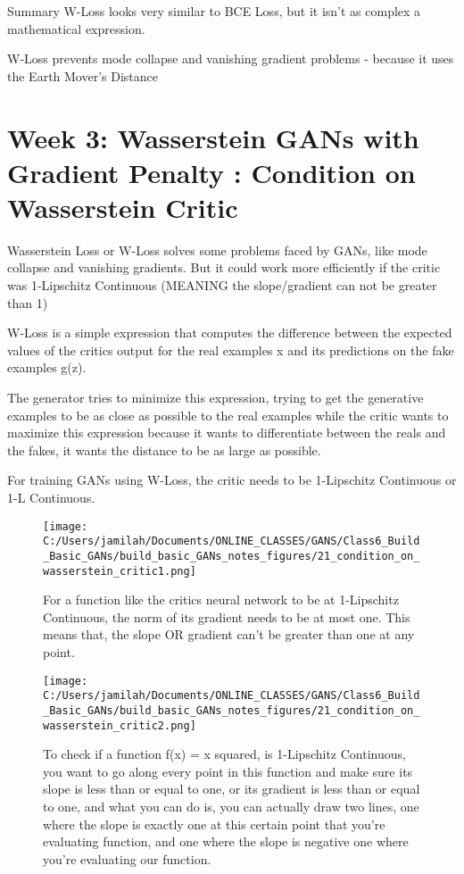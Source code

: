 \documentclass[11pt, onecolumn]{article}
\begin{document}
Summary
W-Loss looks very similar to BCE Loss, but it isn't as complex a mathematical expression.

W-Loss prevents mode collapse and vanishing gradient problems - because it uses the Earth Mover's Distance


\section{Week 3: Wasserstein GANs with Gradient Penalty : Condition on Wasserstein Critic}

Wasserstein Loss or W-Loss solves some problems faced by GANs, like mode collapse and vanishing gradients.
But it could work more efficiently if the critic was 1-Lipschitz Continuous (MEANING the slope/gradient can not be greater than 1)

W-Loss is a simple expression that computes the difference between the expected values of the critics output for the real examples x and its predictions on the fake examples g(z).

The generator tries to minimize this expression, trying to get the generative examples to be as close as possible to the real examples while the critic wants to maximize this expression because it wants to differentiate between the reals and the fakes, it wants the distance to be as large as possible.

For training GANs using W-Loss, the critic needs to be 1-Lipschitz Continuous or 1-L Continuous.

\begin{figure}[htp]
\begin{center}
\texttt{[image: C:/Users/jamilah/Documents/ONLINE\_CLASSES/GANS/Class6\_Build\_Basic\_GANs/build\_basic\_GANs\_notes\_figures/21\_condition\_on\_wasserstein\_critic1.png]}
\end{center}
\caption{For a function like the critics neural network to be at 1-Lipschitz Continuous, the norm of its gradient needs to be at most one. This means that, the slope OR gradient can't be greater than one at any point.}
\label{21_condition_on_wasserstein_critic1}
\end{figure}

\begin{figure}[htp]
\begin{center}
\texttt{[image: C:/Users/jamilah/Documents/ONLINE\_CLASSES/GANS/Class6\_Build\_Basic\_GANs/build\_basic\_GANs\_notes\_figures/21\_condition\_on\_wasserstein\_critic2.png]}
\end{center}
\caption{To check if a function f(x) = x squared, is 1-Lipschitz Continuous, you want to go along every point in this function and make sure its slope is less than or equal to one, or its gradient is less than or equal to one, and what you can do is, you can actually draw two lines, one where the slope is exactly one at this certain point that you're evaluating function, and one where the slope is negative one where you're evaluating our function.}
\label{21_condition_on_wasserstein_critic2}
\end{figure}
\end{document}

